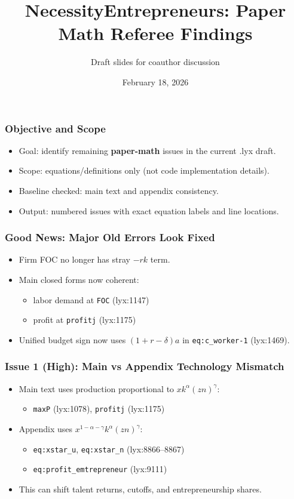 ﻿\documentclass[english,aspectratio=169]{beamer}
\title{NecessityEntrepreneurs: Paper Math Referee Findings}
\author{Draft slides for coauthor discussion}
\institute{Source of truth: Chivers et al. (2025) Necessity Entrepreneurship.lyx}
\date{February 18, 2026}
\begin{document}
\frame{\titlepage}

\begin{frame}
\frametitle{Objective and Scope}
\begin{itemize}
\item Goal: identify remaining \textbf{paper-math} issues in the current .lyx draft.
\item Scope: equations/definitions only (not code implementation details).
\item Baseline checked: main text and appendix consistency.
\item Output: numbered issues with exact equation labels and line locations.
\end{itemize}
\end{frame}

\begin{frame}
\frametitle{Good News: Major Old Errors Look Fixed}
\begin{itemize}
\item Firm FOC no longer has stray $-rk$ term.
\item Main closed forms now coherent:
\begin{itemize}
\item labor demand at \texttt{FOC} (lyx:1147)
\item profit at \texttt{profitj} (lyx:1175)
\end{itemize}
\item Unified budget sign now uses $(1+r-\delta)a$ in \texttt{eq:c\_worker-1} (lyx:1469).
\end{itemize}
\end{frame}

\begin{frame}
\frametitle{Issue 1 (High): Main vs Appendix Technology Mismatch}
\begin{itemize}
\item Main text uses production proportional to $xk^{\alpha}(zn)^{\gamma}$:
\begin{itemize}
\item \texttt{maxP} (lyx:1078), \texttt{profitj} (lyx:1175)
\end{itemize}
\item Appendix uses $x^{1-\alpha-\gamma}k^{\alpha}(zn)^{\gamma}$:
\begin{itemize}
\item \texttt{eq:xstar\_u}, \texttt{eq:xstar\_n} (lyx:8866--8867)
\item \texttt{eq:profit\_emtrepreneur} (lyx:9111)
\end{itemize}
\item This can shift talent returns, cutoffs, and entrepreneurship shares.
\end{itemize}
\end{frame}
\end{document}
